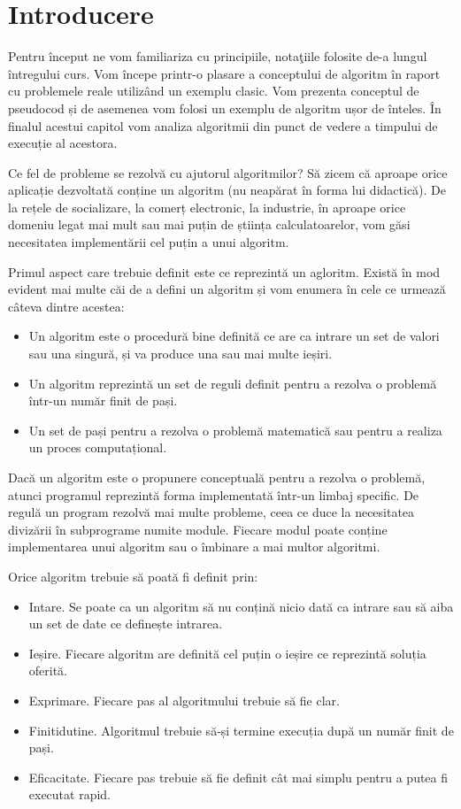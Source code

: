 \chapter{Introducere}
\label{intro}%

Pentru început ne vom familiariza cu principiile, notaţiile folosite de-a lungul întregului curs.
Vom începe printr-o plasare a conceptului de algoritm în raport cu problemele reale utilizând un exemplu clasic. Vom prezenta conceptul de pseudocod și de asemenea vom folosi un exemplu de algoritm ușor de înteles. În finalul acestui capitol vom analiza algoritmii din punct de vedere a timpului de execuție al acestora. 

Ce fel de probleme se rezolvă cu ajutorul algoritmilor? Să zicem că aproape orice aplicație dezvoltată conține un algoritm (nu neapărat în forma lui didactică). De la rețele de socializare, la comerț electronic, la industrie, în aproape orice domeniu legat mai mult sau mai puțin de știința calculatoarelor, vom găsi necesitatea implementării cel puțin a unui algoritm.

Primul aspect care trebuie definit este ce reprezintă un agloritm. Există în mod evident mai multe căi de a defini un algoritm și vom enumera în cele ce urmează câteva dintre acestea:

\begin{itemize}
\item \large{Un algoritm este o procedură bine definită ce are ca intrare un set de valori sau una singură, și va produce una sau mai multe ieșiri.}
\item \large{Un algoritm reprezintă un set de reguli definit pentru a rezolva o problemă într-un număr finit de pași.}
\item \large{Un set de pași pentru a rezolva o problemă matematică sau pentru a realiza un proces computațional.}
\end{itemize}

Dacă un algoritm este o propunere conceptuală pentru a rezolva o problemă, atunci programul reprezintă forma implementată într-un limbaj specific. De regulă un program rezolvă mai multe probleme, ceea ce duce la necesitatea divizării în subprograme numite module. Fiecare modul poate conține implementarea unui algoritm sau o îmbinare a mai multor algoritmi.

Orice algoritm trebuie să poată fi definit prin:

\begin{itemize}
	\item {Intare. Se poate ca un algoritm să nu conțină nicio dată ca intrare sau să aiba un set de date ce definește intrarea.}
	\item {Ieșire. Fiecare algoritm are definită cel puțin o ieșire ce reprezintă soluția oferită.}
	\item {Exprimare. Fiecare pas al algoritmului trebuie să fie clar.}
	\item {Finitidutine. Algoritmul trebuie să-și termine execuția după un număr finit de pași.}
	\item {Eficacitate. Fiecare pas trebuie să fie definit cât mai simplu pentru a putea fi executat rapid.}
	
\end{itemize}


